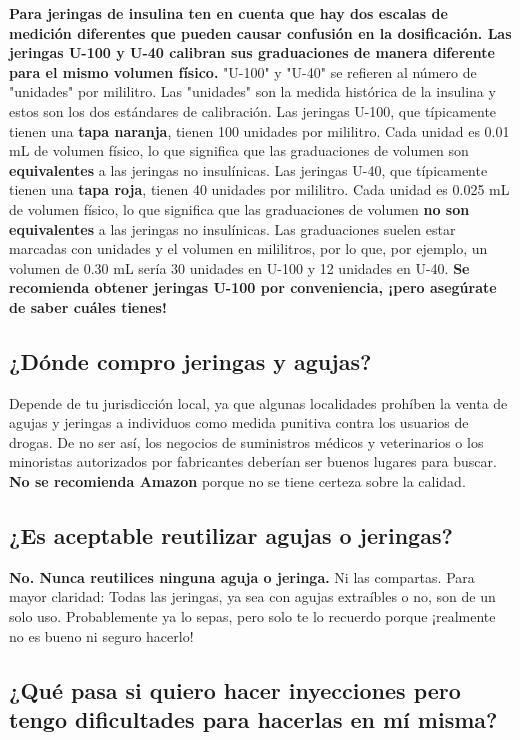 \documentclass{article}
\begin{document}
\textbf{Para jeringas de insulina ten en cuenta que hay dos escalas de medición diferentes que pueden causar confusión en la dosificación. Las jeringas U-100 y U-40 calibran sus graduaciones de manera diferente para el mismo volumen físico.} "U-100" y "U-40" se refieren al número de "unidades" por mililitro. Las "unidades" son la medida histórica de la insulina y estos son los dos estándares de calibración. Las jeringas U-100, que típicamente tienen una \textbf{tapa naranja}, tienen 100 unidades por mililitro. Cada unidad es 0.01 mL de volumen físico, lo que significa que las graduaciones de volumen son \textbf{equivalentes} a las jeringas no insulínicas. Las jeringas U-40, que típicamente tienen una \textbf{tapa roja}, tienen 40 unidades por mililitro. Cada unidad es 0.025 mL de volumen físico, lo que significa que las graduaciones de volumen \textbf{no son equivalentes} a las jeringas no insulínicas. Las graduaciones suelen estar marcadas con unidades y el volumen en mililitros, por lo que, por ejemplo, un volumen de 0.30 mL sería 30 unidades en U-100 y 12 unidades en U-40. \textbf{Se recomienda obtener jeringas U-100 por conveniencia, ¡pero asegúrate de saber cuáles tienes!}

\subsection{¿Dónde compro jeringas y agujas?}

Depende de tu jurisdicción local, ya que algunas localidades prohíben la venta de agujas y jeringas a individuos como medida punitiva contra los usuarios de drogas. De no ser así, los negocios de suministros médicos y veterinarios o los minoristas autorizados por fabricantes deberían ser buenos lugares para buscar. \textbf{No se recomienda Amazon} porque no se tiene certeza sobre la calidad.

\subsection{¿Es aceptable reutilizar agujas o jeringas?}

\textbf{No. Nunca reutilices ninguna aguja o jeringa.} Ni las compartas. Para mayor claridad: Todas las jeringas, ya sea con agujas extraíbles o no, son de un solo uso. Probablemente ya lo sepas, pero solo te lo recuerdo porque ¡realmente no es bueno ni seguro hacerlo!

\subsection{¿Qué pasa si quiero hacer inyecciones pero tengo dificultades para hacerlas en mí misma?}\label{5-21}
\end{document}

